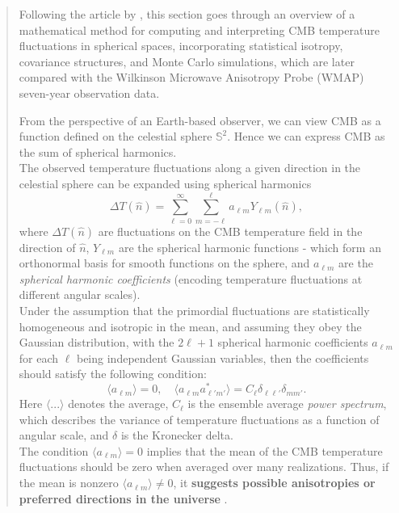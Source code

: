 \documentclass{article}
\theoremstyle{definition}
\begin{document}
\begin{abstract}
Following the article by \cite{Kashino_2012}, this section goes through an overview of a mathematical method for computing and interpreting CMB temperature fluctuations in spherical spaces, incorporating statistical isotropy, covariance structures, and Monte Carlo simulations, which are later compared with the Wilkinson Microwave Anisotropy Probe (WMAP) seven-year observation data.

From the perspective of an Earth-based observer, we can view CMB as a function defined on the celestial sphere $\mathbb{S}^2$. Hence we can express CMB as the sum of spherical harmonics.\\
The observed temperature fluctuations along a given direction in the celestial sphere can be expanded using spherical harmonics
\[\Delta T(\hat{n}) = \sum_{\ell=0}^{\infty} \sum_{m=-\ell}^{\ell} a_{\ell m} Y_{\ell m}(\hat{n}),\]
where $\Delta T(\hat{n})$ are fluctuations on the CMB temperature field in the direction of $\hat{n}$, $Y_{\ell m}$ are the spherical harmonic functions - which form an orthonormal basis for smooth functions on the sphere, and $a_{\ell m}$ are the \textit{spherical harmonic coefficients} (encoding temperature fluctuations at different angular scales). \\
Under the assumption that the primordial fluctuations are statistically homogeneous and isotropic in the mean, and assuming they obey the Gaussian distribution, with the $2\ell+ 1$ spherical harmonic coefficients $a_{\ell m}$ for each $\ell$ being independent Gaussian variables, then the coefficients should satisfy the following condition:
\[\langle a_{\ell m} \rangle = 0, \quad \langle a_{\ell m} a^*_{\ell' m'} \rangle = C_\ell \delta_{\ell \ell'} \delta_{m m'}.\]
Here $\langle ... \rangle$ denotes the average, $C_\ell$ is the ensemble average \textit{power spectrum}, which describes the variance of temperature fluctuations as a function of angular scale, and $\delta$ is the Kronecker delta. \\
The condition $\langle a_{\ell m} \rangle = 0$ implies that the mean of the CMB temperature fluctuations should be zero when averaged over many realizations. Thus, if the mean is nonzero $\langle a_{\ell m} \rangle \neq 0$, it \textbf{suggests possible anisotropies or preferred directions in the universe} \cite{Kashino_2012}.


\end{abstract}
\end{document}
